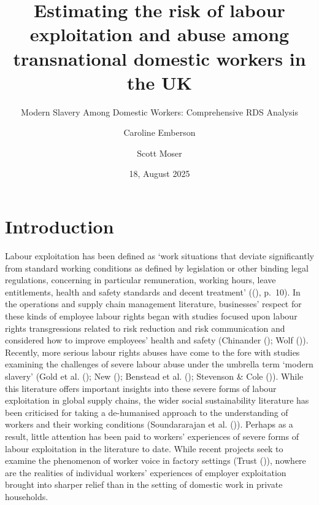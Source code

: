 \documentclass[
  12pt,
]{article}
\title{Estimating the risk of labour exploitation and abuse among
transnational domestic workers in the UK}
\subtitle{Modern Slavery Among Domestic Workers: Comprehensive RDS
Analysis}
\author{Caroline Emberson \and Scott Moser}
\date{18, August 2025}
\theoremstyle{plain}
\theoremstyle{definition}
\renewcommand*\contentsname{Table of contents}
\newcommand\contentsname{Table of contents}
\begin{document}
\maketitle

\renewcommand*\contentsname{Table of contents}
{
\hypersetup{linkcolor=}
\setcounter{tocdepth}{3}
\tableofcontents
}

\newpage

\section{Introduction}\label{introduction}

Labour exploitation has been defined as `work situations that deviate
significantly from standard working conditions as defined by legislation
or other binding legal regulations, concerning in particular
remuneration, working hours, leave entitlements, health and safety
standards and decent treatment'
((),
p.~10). In the operations and supply chain management literature,
businesses' respect for these kinds of employee labour rights began with
studies focused upon labour rights transgressions related to risk
reduction and risk communication and considered how to improve
employees' health and safety (Chinander
(); Wolf
()). Recently, more
serious labour rights abuses have come to the fore with studies
examining the challenges of severe labour abuse under the umbrella term
`modern slavery' (Gold et al. ();
New (); Benstead et al.
(); Stevenson \& Cole
()). While this literature
offers important insights into these severe forms of labour exploitation
in global supply chains, the wider social sustainability literature has
been criticised for taking a de-humanised approach to the understanding
of workers and their working conditions (Soundararajan et al.
()). Perhaps as a
result, little attention has been paid to workers' experiences of severe
forms of labour exploitation in the literature to date. While recent
projects seek to examine the phenomenon of worker voice in factory
settings (Trust ()),
nowhere are the realities of individual workers' experiences of employer
exploitation brought into sharper relief than in the setting of domestic
work in private households.
\end{document}
